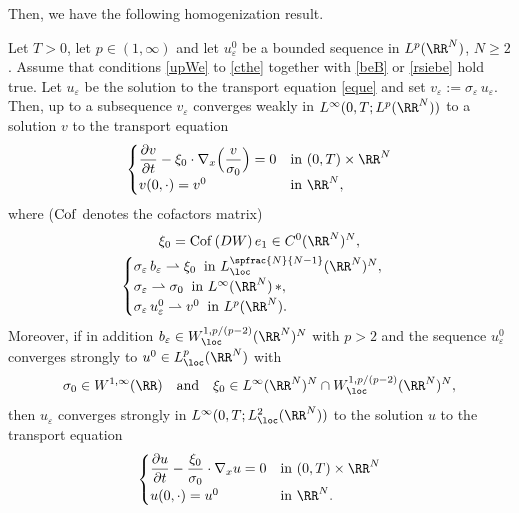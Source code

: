 Then, we have the following homogenization result.
\begin{Thm}\label{thm.hom}
Let $T>0$, let $p\in(1,\infty)$ and let $u_\varepsilon^0$ be a bounded sequence in $L^p(\RR^N)$, $N\geq 2$. Assume that conditions \eqref{upWe} to \eqref{cthe} together with \eqref{beB} or \eqref{rsiebe} hold true.
Let $u_\varepsilon$ be the solution to the transport equation \eqref{eque} and set $v_\varepsilon:=\sigma_\varepsilon\,u_\varepsilon$.
Then, up to a subsequence $v_\varepsilon$ converges weakly in $L^\infty(0,T;L^p(\RR^N))$ to a solution $v$ to the transport equation
\begin{equation}\label{eqv}
\begin{cases}
\dfrac{\partial v}{\partial t}-\xi_0\cdot\nabla_x\Bigl(\dfrac{v}{\sigma_0}\Bigr)=0 & \mbox{in }(0,T)\times\RR^N
\\
v(0,\cdot)=v^0 & \mbox{in }\RR^N,
\end{cases}
\end{equation}
where (${\rm Cof}$ denotes the cofactors matrix)
\begin{gather}\label{xi0cofDW}
\xi_0={\rm Cof}\,(DW)\,e_1\in C^0(\RR^N)^N,
\\
\label{xisiv0}
\begin{cases}
\sigma_\varepsilon\,b_\varepsilon\rightharpoonup \xi_0\;\;\mbox{in }L^{\spfrac{N}{N-1}}_\loc(\RR^N)^N,\\
\sigma_\varepsilon\rightharpoonup\sigma_0\;\;\mbox{in }L^\infty(\RR^N)\,\ast,\\
\sigma_\varepsilon\,u_\varepsilon^0\rightharpoonup v^0\;\;\mbox{in }L^p(\RR^N).
\end{cases}
\end{gather}
Moreover, if in addition $b_\varepsilon\in W^{1,p/(p-2)}_\loc(\RR^N)^N$ with $p>2$ and the sequence $u_\varepsilon^0$ converges strongly to $u^0\in L^p_\loc(\RR^N)$ with
\[
\sigma_0\in W^{1,\infty}(\RR)\quad\text{and}\quad\xi_0\in L^\infty(\RR^N)^N\cap W^{1,p/(p-2)}_\loc(\RR^N)^N,
\]
then $u_\varepsilon$ converges strongly in $L^\infty(0,T;L^2_\loc(\RR^N))$ to the solution $u$ to the transport equation
\begin{equation}\label{equ}
\begin{cases}
\dfrac{\partial u}{\partial t}-\dfrac{\xi_0}{\sigma_0}\cdot\nabla_x u=0 & \mbox{in }(0,T)\times\RR^N
\\[5pt]
u(0,\cdot)=u^0 & \mbox{in }\RR^N.
\end{cases}
\end{equation}
\end{Thm}
